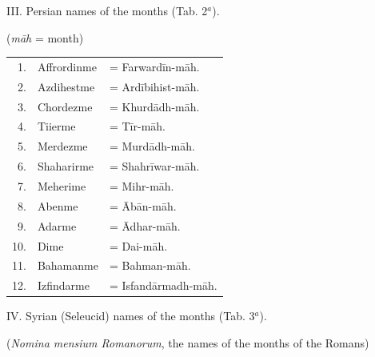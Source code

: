 \documentclass[11pt]{article}
\newcommand{\Pg}[1]{\marginpar{\footnotesize\color{gray}#1}}
\begin{document}
\par\begin{center}III. Persian names of the months (Tab. 2$^{a}$).\end{center}
\par\begin{center}(\emph{māh} = month)\end{center}
\begin{center}\small\begin{tabular}{rll}
1. & Affrordinme & = Farwardīn-māh. \\
2. & Azdihestme & = Ardībihist-māh.\footnotemarkT{} \\
3. & Chordezme & = Khurdādh-māh. \\
4. & Tiierme & = Tīr-māh. \\
5. & Merdezme & = Murdādh-māh. \\
6. & Shaharirme & = Shahrīwar-māh. \\
7. & Meherime & = Mihr-māh. \\
8. & Abenme & = Ābān-māh. \\
9. & Adarme & = Ādhar-māh. \\
10. & Dime & = Dai-māh. \\
11. & Bahamanme & = Bahman-māh. \\
12. & Izfindarme & = Isfandārmadh-māh. \\
\end{tabular}\end{center}
\addtocounter{footnoteT}{-1}
\par\begin{center}\Pg{248}IV. Syrian (Seleucid) names of the months (Tab. 3$^{a}$).\end{center}
\par\begin{center}(\emph{Nomina mensium Romanorum}, the names of the months of the Romans)\end{center}
\end{document}
